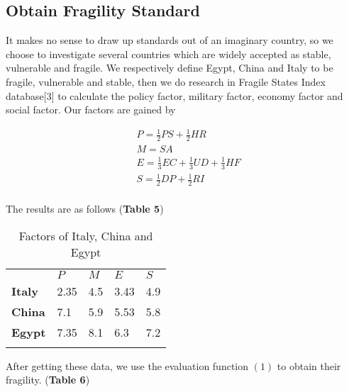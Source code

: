 \documentclass{mcmthesis}
\newlength\savedwidth
\newcommand\whline{\noalign{\global\savedwidth\arrayrulewidth
		\global\arrayrulewidth 1.2pt}%
	\hline
	\noalign{\global\arrayrulewidth\savedwidth}}
\newlength\savewidth
\newcommand\shline{\noalign{\global\savewidth\arrayrulewidth
		\global\arrayrulewidth 1.2pt}%
	\hline
	\noalign{\global\arrayrulewidth\savewidth}}
\begin{document}
	\subsection{Obtain Fragility Standard}
	It makes no sense to draw up standards out of an imaginary country, so we choose to investigate several countries which are widely accepted as stable, vulnerable and fragile.
	We respectively define Egypt, China and Italy to be fragile, vulnerable and stable, then we do research in Fragile States Index database[3] to calculate the policy factor, military factor, economy factor and social factor. Our factors are gained by 
	\begin{spacing}{1.5}
		\begin{equation}
		\begin{aligned}
		&P=\frac{1}{2}PS+\frac{1}{2}HR\\
		&M=SA\\
		&E=\frac{1}{3}EC+\frac{1}{3}UD+\frac{1}{3}HF\\
		&S=\frac{1}{2}DP+\frac{1}{2}RI\\
		\end{aligned}
		\end{equation}
	\end{spacing}
	
	The results are as follows (\textbf{Table 5})
	
	\begin{table}[htbp]
		\renewcommand\arraystretch{1.5}
		\footnotesize
		\centering
		\begin{tabular}{m{2cm}<{\centering}|m{2cm}<{\centering}|m{2cm}<{\centering}|m{2cm}<{\centering}|m{2cm}<{\centering}}
			\whline
			&\textbf{$P$}&\textbf{$M$}&\textbf{$E$}&\textbf{$S$}\\
			\whline
			\textbf{Italy}& 2.35 & 4.5 & 3.43 & 4.9\\
			
			\textbf{China}& 7.1 & 5.9 & 5.53 & 5.8\\
			
			\textbf{Egypt}& 7.35 & 8.1 & 6.3 & 7.2\\
			
			\shline
		\end{tabular}
		\caption{Factors of Italy, China and Egypt}\label{tab:Factors of Italy, China and Egypt}
	\end{table}
	After getting these data, we use the evaluation function $(1)$ to obtain their fragility. (\textbf{Table 6})
	
\end{document}
